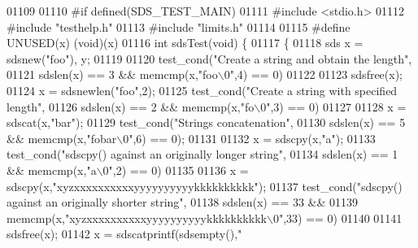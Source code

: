 \begin{DoxyCode}
{{{{{{{{{{{{{{{{01109 
01110 \textcolor{preprocessor}{#}\textcolor{preprocessor}{if} \textcolor{preprocessor}{defined}\textcolor{preprocessor}{(}\textcolor{preprocessor}{SDS\_TEST\_MAIN}\textcolor{preprocessor}{)}
01111 \textcolor{preprocessor}{#}\textcolor{preprocessor}{include} \textcolor{preprocessor}{<}\textcolor{preprocessor}{stdio}\textcolor{preprocessor}{.}\textcolor{preprocessor}{h}\textcolor{preprocessor}{>}
01112 \textcolor{preprocessor}{#}\textcolor{preprocessor}{include} \textcolor{stringliteral}{"testhelp.h"}
01113 \textcolor{preprocessor}{#}\textcolor{preprocessor}{include} \textcolor{stringliteral}{"limits.h"}
01114 
01115 \textcolor{preprocessor}{#}\textcolor{preprocessor}{define} \textcolor{preprocessor}{UNUSED}\textcolor{preprocessor}{(}\textcolor{preprocessor}{x}\textcolor{preprocessor}{)} \textcolor{preprocessor}{(}\textcolor{preprocessor}{void}\textcolor{preprocessor}{)}\textcolor{preprocessor}{(}\textcolor{preprocessor}{x}\textcolor{preprocessor}{)}
01116 \textcolor{keywordtype}{int} sdsTest(\textcolor{keywordtype}{void}) \{
01117     \{
01118         sds x = sdsnew(\textcolor{stringliteral}{"foo"}), y;
01119 
01120         test\_cond(\textcolor{stringliteral}{"Create a string and obtain the length"},
01121             sdslen(x) == 3 && memcmp(x,\textcolor{stringliteral}{"foo\(\backslash\)0"},4) == 0)
01122 
01123         sdsfree(x);
01124         x = sdsnewlen(\textcolor{stringliteral}{"foo"},2);
01125         test\_cond(\textcolor{stringliteral}{"Create a string with specified length"},
01126             sdslen(x) == 2 && memcmp(x,\textcolor{stringliteral}{"fo\(\backslash\)0"},3) == 0)
01127 
01128         x = sdscat(x,\textcolor{stringliteral}{"bar"});
01129         test\_cond(\textcolor{stringliteral}{"Strings concatenation"},
01130             sdslen(x) == 5 && memcmp(x,\textcolor{stringliteral}{"fobar\(\backslash\)0"},6) == 0);
01131 
01132         x = sdscpy(x,\textcolor{stringliteral}{"a"});
01133         test\_cond(\textcolor{stringliteral}{"sdscpy() against an originally longer string"},
01134             sdslen(x) == 1 && memcmp(x,\textcolor{stringliteral}{"a\(\backslash\)0"},2) == 0)
01135 
01136         x = sdscpy(x,\textcolor{stringliteral}{"xyzxxxxxxxxxxyyyyyyyyyykkkkkkkkkk"});
01137         test\_cond(\textcolor{stringliteral}{"sdscpy() against an originally shorter string"},
01138             sdslen(x) == 33 &&
01139             memcmp(x,\textcolor{stringliteral}{"xyzxxxxxxxxxxyyyyyyyyyykkkkkkkkkk\(\backslash\)0"},33) == 0)
01140 
01141         sdsfree(x);
01142         x = sdscatprintf(sdsempty(),\textcolor{stringliteral}{"%
}}}}}}}}}}}}}}}}}
\end{DoxyCode}
